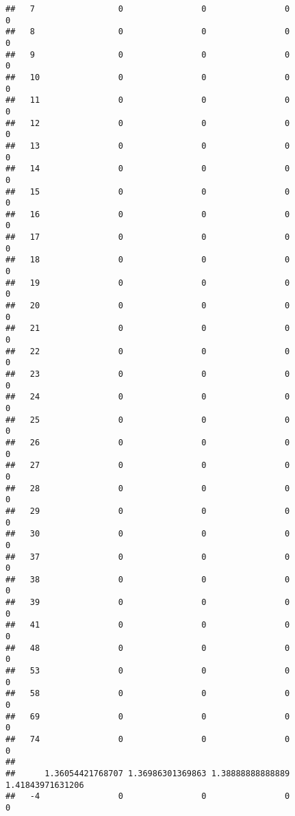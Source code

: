 \documentclass[]{article}
\begin{document}
\begin{verbatim}
##   7                 0                0                0                0
##   8                 0                0                0                0
##   9                 0                0                0                0
##   10                0                0                0                0
##   11                0                0                0                0
##   12                0                0                0                0
##   13                0                0                0                0
##   14                0                0                0                0
##   15                0                0                0                0
##   16                0                0                0                0
##   17                0                0                0                0
##   18                0                0                0                0
##   19                0                0                0                0
##   20                0                0                0                0
##   21                0                0                0                0
##   22                0                0                0                0
##   23                0                0                0                0
##   24                0                0                0                0
##   25                0                0                0                0
##   26                0                0                0                0
##   27                0                0                0                0
##   28                0                0                0                0
##   29                0                0                0                0
##   30                0                0                0                0
##   37                0                0                0                0
##   38                0                0                0                0
##   39                0                0                0                0
##   41                0                0                0                0
##   48                0                0                0                0
##   53                0                0                0                0
##   58                0                0                0                0
##   69                0                0                0                0
##   74                0                0                0                0
##     
##      1.36054421768707 1.36986301369863 1.38888888888889 1.41843971631206
##   -4                0                0                0                0

\end{verbatim}
\end{document}
